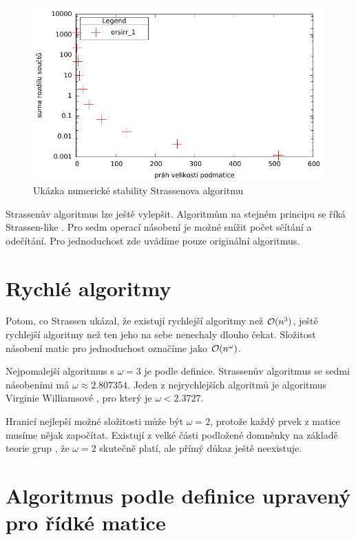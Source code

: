 \begin{figure}[H]\centering
	\includegraphics[width=\textwidth]{./images/strassen_stability}
	\caption{Ukázka numerické stability Strassenova algoritmu}
	\label{fig:StrassenStability}
\end{figure}

Strassenův algoritmus lze ještě vylepšit. Algoritmům na stejném principu se říká Strassen-like \cite{DBLP:journals/iacr/CenkH13}. Pro sedm operací násobení je možné snížit počet sčítání a odečítání. Pro jednoduchost zde uvádíme pouze originální algoritmus.

\section{Rychlé algoritmy}

Potom, co Strassen ukázal, že existují rychlejší algoritmy než $\mathcal{O}(n^3)$, ještě rychlejší algoritmy než ten jeho na sebe nenechaly dlouho čekat. Složitost násobení matic pro jednoduchost označíme jako $\mathcal{O}(n^\omega)$.

Nejpomalejší algoritmus s $\omega=3$ je podle definice. Strassenův algoritmus se sedmi násobeními má $\omega\approx2.807354$. Jeden z nejrychlejších algoritmů je algoritmus Virginie Williamsové \cite{DBLP:conf/stoc/Williams12}\cite{BreakigCWB}, pro který je $\omega<2.3727$. 

Hranicí nejlepší možné složitosti může být $\omega=2$, protože každý prvek z matice musíme nějak započítat. Existují z velké části podložené domněnky na základě teorie grup \cite{complexityMM}, že $\omega=2$ skutečně platí, ale přímý důkaz ještě neexistuje.

\section{Algoritmus podle definice upravený pro řídké matice}

